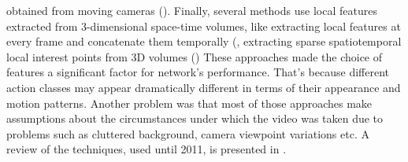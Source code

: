 obtained from moving cameras (\cite{1541251}). Finally, several methods use local features extracted from 3-dimensional space-time volumes,
like extracting local features at every frame and concatenate them temporally (\cite{784616, 990935, 1544882}, extracting sparse
spatiotemporal local interest points from 3D volumes (\cite{1238378, 1570899, Niebles, 1467373, Ryoo2006})
These approaches made the choice of
features a significant factor for network's performance. That's because different action classes may appear dramatically
different in terms of their appearance and motion patterns. Another problem was that most of those approaches make
assumptions about the circumstances under which the video was taken due to problems such as cluttered
background, camera viewpoint variations etc. A review of the techniques, used until 2011, is presented in \cite{Aggarwal:2011:HAA:1922649.1922653}. \par

